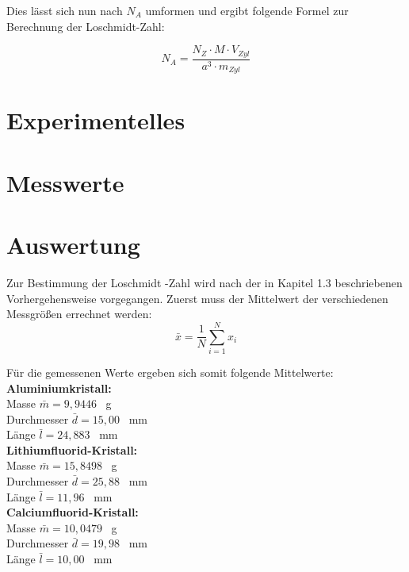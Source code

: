 \documentclass[12pt,a4paper,titlepage,headinclude,bibtotoc]{scrartcl}
\begin{document}
Dies lässt sich nun nach $N_A$ umformen und ergibt folgende Formel zur Berechnung der Loschmidt-Zahl:

\begin{equation}
N_A= \frac{N_Z \cdot M \cdot V_{Zyl}}{a^3 \cdot m_{Zyl}}
\end{equation}
 


\section{Experimentelles}
\section{Messwerte}
\section{Auswertung}
Zur Bestimmung der Loschmidt -Zahl wird nach der in Kapitel 1.3 beschriebenen Vorhergehensweise vorgegangen. Zuerst muss der Mittelwert der verschiedenen Messgrößen errechnet werden:
\begin{equation}
\bar{x}=\frac{1}{N} \sum_{i=1}^N x_i
\end{equation}

Für die gemessenen Werte ergeben sich somit folgende Mittelwerte:\\

\vspace{3mm}
\textbf{Aluminiumkristall:}\\
Masse $\bar{m}=9,9446$ \ g \\
Durchmesser $\bar{d}=15,00$ \ mm \\
Länge $\bar{l}=24,883$ \ mm\\

\vspace{3mm}
\textbf{Lithiumfluorid-Kristall:}\\
Masse $\bar{m}=15,8498$ \ g \\
Durchmesser $\bar{d}=25,88$ \ mm \\
Länge $\bar{l}=11,96$ \ mm\\

\vspace{3mm}
\textbf{Calciumfluorid-Kristall:}\\
Masse $\bar{m}=10,0479$ \ g \\
Durchmesser $\bar{d}=19,98$ \ mm \\
Länge $\bar{l}=10,00$ \ mm\\
\end{document}
